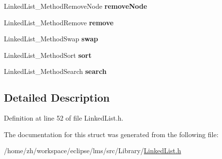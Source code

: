 \begin{DoxyCompactItemize}
\item 
\hypertarget{structLinkedListMethods_abf72d96ec7440456fa524c4e45640681}{Linked\-List\-\_\-\-Method\-Remove\-Node {\bfseries remove\-Node}}\label{structLinkedListMethods_abf72d96ec7440456fa524c4e45640681}

\item 
\hypertarget{structLinkedListMethods_a465baf42ba3c3b387e04df653ce2af43}{Linked\-List\-\_\-\-Method\-Remove {\bfseries remove}}\label{structLinkedListMethods_a465baf42ba3c3b387e04df653ce2af43}

\item 
\hypertarget{structLinkedListMethods_a9c935eba2050b587631f7040f656ec13}{Linked\-List\-\_\-\-Method\-Swap {\bfseries swap}}\label{structLinkedListMethods_a9c935eba2050b587631f7040f656ec13}

\item 
\hypertarget{structLinkedListMethods_ab5e5414b4098741dee849a9746811e0a}{Linked\-List\-\_\-\-Method\-Sort {\bfseries sort}}\label{structLinkedListMethods_ab5e5414b4098741dee849a9746811e0a}

\item 
\hypertarget{structLinkedListMethods_ac6c300cf4e225d459a922e7ce870a3fa}{Linked\-List\-\_\-\-Method\-Search {\bfseries search}}\label{structLinkedListMethods_ac6c300cf4e225d459a922e7ce870a3fa}

\end{DoxyCompactItemize}


\subsection{Detailed Description}


Definition at line 52 of file Linked\-List.\-h.



The documentation for this struct was generated from the following file\-:\begin{DoxyCompactItemize}
\item 
/home/zh/workspace/eclipse/lms/src/\-Library/\hyperlink{LinkedList_8h}{Linked\-List.\-h}\end{DoxyCompactItemize}
